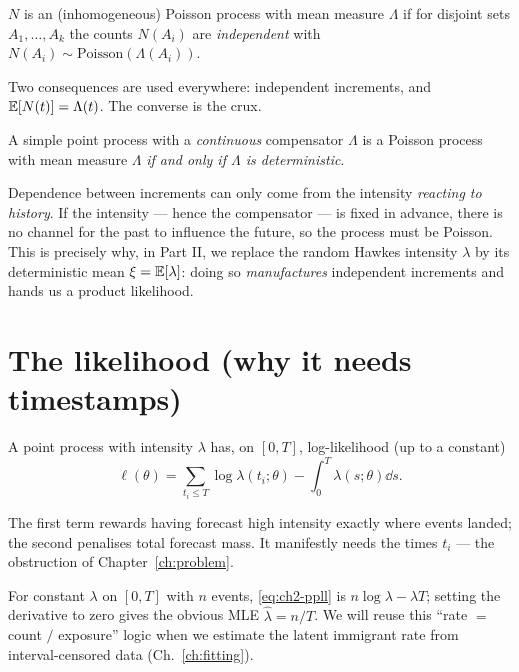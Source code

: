 \begin{definition}
$N$ is an (inhomogeneous) Poisson process with mean measure $\Lambda$ if for
disjoint sets $A_1,\dots,A_k$ the counts $N(A_i)$ are \emph{independent} with
$N(A_i)\sim\mathrm{Poisson}(\Lambda(A_i))$.
\end{definition}

Two consequences are used everywhere: independent increments, and
$\mathbb{E}[N(t)]=\Lambda(t)$. The converse is the crux.

\begin{theorem}[Watanabe]\label{thm:ch2-watanabe}
A simple point process with a \emph{continuous} compensator $\Lambda$ is a Poisson
process with mean measure $\Lambda$ \emph{if and only if $\Lambda$ is
deterministic}.
\end{theorem}

\begin{whybox}
Dependence between increments can only come from the intensity \emph{reacting to
history}. If the intensity --- hence the compensator --- is fixed in advance, there
is no channel for the past to influence the future, so the process must be Poisson.
This is precisely why, in Part II, we replace the random Hawkes intensity
$\lambda$ by its deterministic mean $\xi=\mathbb{E}[\lambda]$: doing so \emph{manufactures}
independent increments and hands us a product likelihood.
\end{whybox}

\section{The likelihood (why it needs timestamps)}

\begin{theorem}[Jacod]\label{thm:ch2-jacod}
A point process with intensity $\lambda$ has, on $[0,T]$, log-likelihood (up to a
constant)
\begin{equation}
\ell(\theta)=\sum_{t_i\le T}\log\lambda(t_i;\theta)-\int_0^T\lambda(s;\theta)\dd s.
\label{eq:ch2-ppll}
\end{equation}
\end{theorem}
The first term rewards having forecast high intensity exactly where events landed;
the second penalises total forecast mass. It manifestly needs the times $t_i$ ---
the obstruction of Chapter~\ref{ch:problem}.

\begin{examplebox}
For constant $\lambda$ on $[0,T]$ with $n$ events, \eqref{eq:ch2-ppll} is
$n\log\lambda-\lambda T$; setting the derivative to zero gives the obvious MLE
$\hat\lambda=n/T$. We will reuse this ``rate $=$ count $/$ exposure'' logic when we
estimate the latent immigrant rate from interval-censored data (Ch.~\ref{ch:fitting}).
\end{examplebox}

